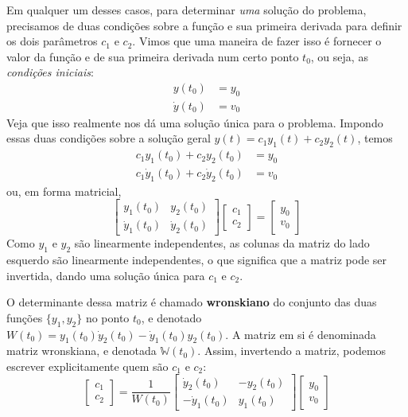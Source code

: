 \documentclass[12pt,a4paper,oneside]{memoir}
\newcommand{\WronskianMatrix}{\mathbb{W}}
\begin{document}
Em qualquer um desses casos, para determinar \emph{uma} solução do problema, precisamos de duas condições sobre a função e sua primeira derivada para definir os dois parâmetros $c_1$ e $c_2$.  Vimos que uma maneira de fazer isso é fornecer o valor da função e de sua primeira derivada num certo ponto $t_0$, ou seja, as \emph{condições iniciais}:
\begin{equation}
  \begin{aligned}
          y(t_0) &= y_0 \\
    \dot{y}(t_0) &= v_0
  \end{aligned}
\end{equation}
%
Veja que isso realmente nos dá uma solução única para o problema.  Impondo essas duas condições sobre a solução geral $y(t) = c_1 y_1(t) + c_2 y_2(t)$, temos
\begin{equation}
  \begin{aligned}
    c_1 y_1(t_0)       + c_2 y_2(t_0)       &= y_0 \\
    c_1 \dot{y}_1(t_0) + c_2 \dot{y}_2(t_0) &= v_0
  \end{aligned}
\end{equation}
ou, em forma matricial,
\begin{equation}
  \begin{bmatrix}
          y_1(t_0)  &       y_2(t_0)  \\
    \dot{y}_1(t_0)  & \dot{y}_2(t_0)
  \end{bmatrix}
  \begin{bmatrix}
    c_1 \\
    c_2
  \end{bmatrix}
  =
  \begin{bmatrix}
    y_0 \\
    v_0
  \end{bmatrix}
\end{equation}
%
Como $y_1$ e $y_2$ são linearmente independentes, as colunas da matriz do lado esquerdo são linearmente independentes, o que significa que a matriz pode ser invertida, dando uma solução única para $c_1$ e $c_2$.

O determinante dessa matriz é chamado \textbf{wronskiano} do conjunto das duas funções $\{y_1, y_2\}$ no ponto $t_0$, e denotado $W(t_0) = y_1(t_0) \dot{y}_2(t_0) - \dot{y}_1(t_0) y_2(t_0)$.  A matriz em si é denominada matriz wronskiana, e denotada $\WronskianMatrix(t_0)$.  Assim, invertendo a matriz, podemos escrever explicitamente quem são $c_1$ e $c_2$:
\begin{equation}
\label{c1c2}
  \begin{bmatrix}
    c_1 \\
    c_2
  \end{bmatrix}
  =
  \frac{1}{W(t_0)}
  \begin{bmatrix}
    \dot{y}_2(t_0)  &      -y_2(t_0)  \\
   -\dot{y}_1(t_0)  &       y_1(t_0)
  \end{bmatrix}
  \begin{bmatrix}
    y_0 \\
    v_0
  \end{bmatrix}
\end{equation}
\end{document}
